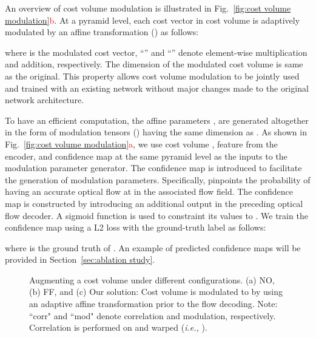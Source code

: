 \documentclass[runningheads]{llncs}
\newcommand{\ie}{\emph{i.e., }}
\begin{document}
An overview of cost volume modulation is illustrated in Fig.~\ref{fig:cost volume modulation}\textcolor{red}{b}. At a pyramid level, each cost vector  in cost volume  is adaptively modulated by an affine transformation () as follows:

where  is the modulated cost vector, ``'' and ``'' denote element-wise multiplication and addition, respectively.
The dimension of the modulated cost volume is same as the original. This property allows cost volume modulation to be jointly used and trained with an existing network without major changes made to the original network architecture.

To have an efficient computation, the affine parameters , are generated altogether in the form of modulation tensors () having the same dimension as . As shown in Fig.~\ref{fig:cost volume modulation}\textcolor{red}{a}, we use cost volume , feature  from the encoder, and confidence map  at the same pyramid level as the inputs to the modulation parameter generator.
The confidence map is introduced to facilitate the generation of modulation parameters. Specifically,  pinpoints the probability of having an accurate optical flow at  in the associated flow field. The confidence map is constructed by introducing an additional output in the preceding optical flow decoder. A sigmoid function is used to constraint its values to . We train the confidence map using a L2 loss with the ground-truth label  as follows:

where  is the ground truth of . An example of predicted confidence maps will be provided in Section~\ref{sec:ablation study}. 

\begin{figure}[t]
\centering
\captionsetup[subfigure]{labelformat=empty}
\caption{Augmenting a cost volume under different configurations. (a) NO, (b) FF, and (c) Our solution: Cost volume  is modulated to  by using an adaptive affine transformation prior to the flow decoding. Note: ``corr" and ``mod" denote correlation and modulation, respectively. Correlation is performed on  and warped  (\ie ).}
\label{fig:flow decoding}
\end{figure}
\end{document}
